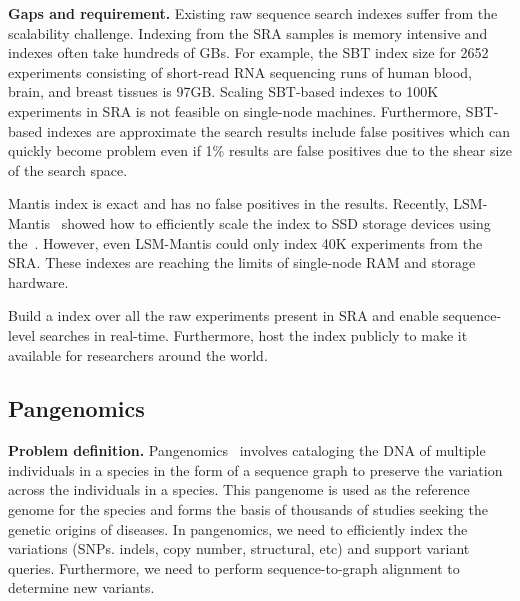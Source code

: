 \noindent
{\bf Gaps and requirement.}
Existing raw sequence search indexes suffer from the scalability challenge. Indexing \kmers from the SRA samples is memory intensive and indexes often take hundreds of GBs. For example, the SBT index size for 2652 experiments consisting of short-read RNA sequencing runs of human blood, brain, and breast tissues is 97GB. Scaling SBT-based indexes to 100K experiments in SRA is not feasible on single-node machines. 
Furthermore, SBT-based indexes are approximate the search results include false positives which can quickly become problem even if 1\% results are false positives due to the shear size of the search space.

Mantis index is exact and has no false positives in the results. Recently, LSM-Mantis~\cite{almodaresi2022incrementally} showed how to efficiently scale the index to SSD storage devices using the~\cite{BentleyS80}. However, even LSM-Mantis could only index 40K experiments from the SRA. These indexes are reaching the limits of single-node RAM and storage hardware.

\begin{rproblem}
Build a \kmer index over all the raw experiments present in SRA and enable sequence-level searches in real-time. Furthermore, host the index publicly to make it available for researchers around the world. 
\label{rprob:peppermint2}
\end{rproblem}

\subsection{Pangenomics}

{\bf Problem definition.}
Pangenomics~\cite{sherman2020pan} involves cataloging the DNA of multiple individuals in a species in the form of a sequence graph to preserve the variation across the individuals in a species. This pangenome is used as the reference genome for the species and forms the basis of thousands of studies seeking the genetic origins of diseases. In pangenomics, we need to efficiently index the variations (SNPs. indels, copy number, structural, etc) and support variant queries. Furthermore, we need to perform sequence-to-graph alignment to determine new variants. 


